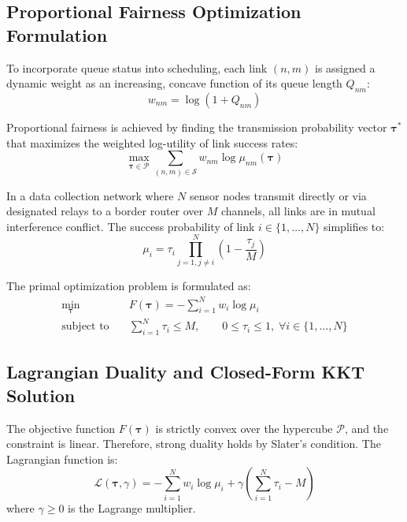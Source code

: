 \subsection{Proportional Fairness Optimization Formulation}
To incorporate queue status into scheduling, each link $(n, m)$ is assigned a dynamic weight as an increasing, concave function of its queue length $Q_{nm}$:
\begin{equation}
    w_{nm} = \log\left( 1 + Q_{nm} \right)
\end{equation}

Proportional fairness is achieved by finding the transmission probability vector $\boldsymbol{\tau}^*$ that maximizes the weighted log-utility of link success rates:
\begin{equation}
    \max_{\boldsymbol{\tau} \in \mathcal{P}} \sum_{(n, m) \in \mathcal{S}} w_{nm} \log \mu_{nm}(\boldsymbol{\tau})
\end{equation}

In a data collection network where $N$ sensor nodes transmit directly or via designated relays to a border router over $M$ channels, all links are in mutual interference conflict. The success probability of link $i \in \{1, \dots, N\}$ simplifies to:
\begin{equation}
    \mu_i = \tau_i \prod_{j=1, j \ne i}^N \left( 1 - \frac{\tau_j}{M} \right)
\end{equation}

The primal optimization problem is formulated as:
\begin{align}
    \label{eq:cbpf_optimization}
    \min_{\boldsymbol{\tau}} \quad & F(\boldsymbol{\tau}) = -\sum_{i=1}^N w_i \log \mu_i \nonumber \\
    \text{subject to} \quad & \sum_{i=1}^N \tau_i \le M, \qquad 0 \le \tau_i \le 1, \; \forall i \in \{1, \dots, N\}
\end{align}

\subsection{Lagrangian Duality and Closed-Form KKT Solution}
The objective function $F(\boldsymbol{\tau})$ is strictly convex over the hypercube $\mathcal{P}$, and the constraint is linear. Therefore, strong duality holds by Slater's condition. The Lagrangian function is:
\begin{equation}
    \mathcal{L}(\boldsymbol{\tau}, \gamma) = -\sum_{i=1}^N w_i \log \mu_i + \gamma \left( \sum_{i=1}^N \tau_i - M \right)
\end{equation}
where $\gamma \ge 0$ is the Lagrange multiplier.

